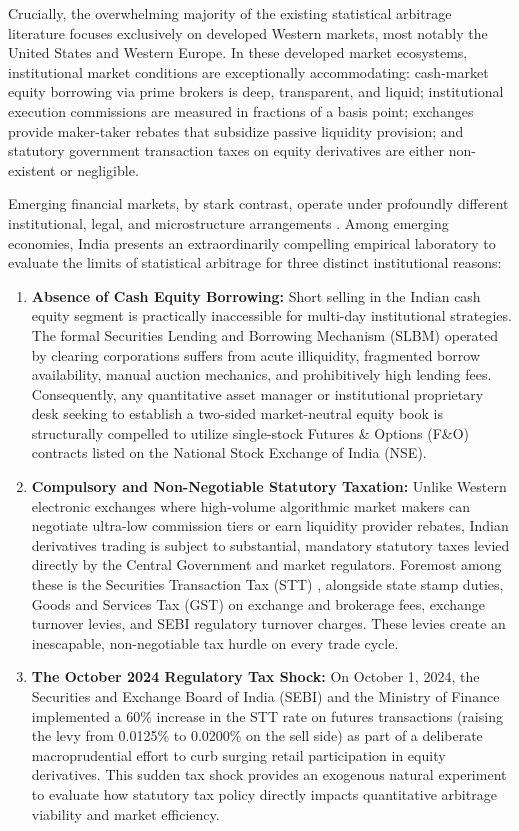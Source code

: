 \documentclass[11pt,a4paper]{article}
\begin{document}
Crucially, the overwhelming majority of the existing statistical arbitrage literature focuses exclusively on developed Western markets, most notably the United States and Western Europe. In these developed market ecosystems, institutional market conditions are exceptionally accommodating: cash-market equity borrowing via prime brokers is deep, transparent, and liquid; institutional execution commissions are measured in fractions of a basis point; exchanges provide maker-taker rebates that subsidize passive liquidity provision; and statutory government transaction taxes on equity derivatives are either non-existent or negligible. 

Emerging financial markets, by stark contrast, operate under profoundly different institutional, legal, and microstructure arrangements \citep{bekaert2007liquidity,bose2007securities}. Among emerging economies, India presents an extraordinarily compelling empirical laboratory to evaluate the limits of statistical arbitrage for three distinct institutional reasons:
\begin{enumerate}
    \item \textbf{Absence of Cash Equity Borrowing:} Short selling in the Indian cash equity segment is practically inaccessible for multi-day institutional strategies. The formal Securities Lending and Borrowing Mechanism (SLBM) operated by clearing corporations suffers from acute illiquidity, fragmented borrow availability, manual auction mechanics, and prohibitively high lending fees. Consequently, any quantitative asset manager or institutional proprietary desk seeking to establish a two-sided market-neutral equity book is structurally compelled to utilize single-stock Futures \& Options (F\&O) contracts listed on the National Stock Exchange of India (NSE).
    \item \textbf{Compulsory and Non-Negotiable Statutory Taxation:} Unlike Western electronic exchanges where high-volume algorithmic market makers can negotiate ultra-low commission tiers or earn liquidity provider rebates, Indian derivatives trading is subject to substantial, mandatory statutory taxes levied directly by the Central Government and market regulators. Foremost among these is the Securities Transaction Tax (STT) \citep{bose2007securities}, alongside state stamp duties, Goods and Services Tax (GST) on exchange and brokerage fees, exchange turnover levies, and SEBI regulatory turnover charges. These levies create an inescapable, non-negotiable tax hurdle on every trade cycle.
    \item \textbf{The October 2024 Regulatory Tax Shock:} On October 1, 2024, the Securities and Exchange Board of India (SEBI) and the Ministry of Finance implemented a 60\% increase in the STT rate on futures transactions (raising the levy from 0.0125\% to 0.0200\% on the sell side) as part of a deliberate macroprudential effort to curb surging retail participation in equity derivatives. This sudden tax shock provides an exogenous natural experiment to evaluate how statutory tax policy directly impacts quantitative arbitrage viability and market efficiency.
\end{enumerate}
\end{document}
